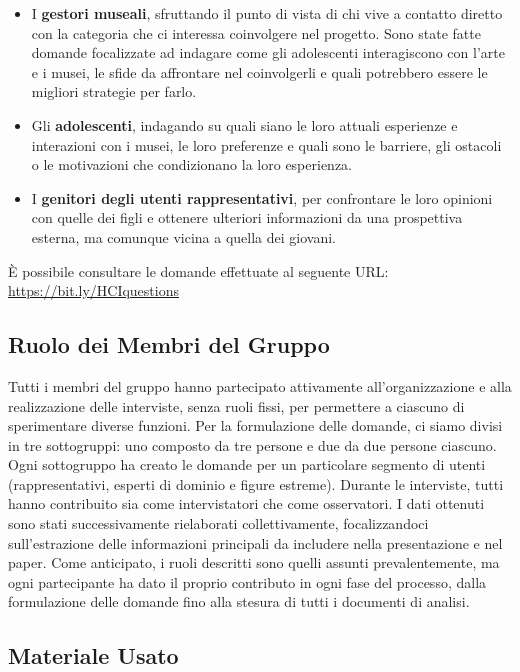 \documentclass{article}
\begin{document}
\begin{itemize}
    \item I \textbf{gestori museali}, sfruttando il punto di vista di chi vive a contatto diretto con la categoria che ci interessa coinvolgere nel progetto. Sono state fatte domande focalizzate ad indagare come gli adolescenti interagiscono con l'arte e i musei, le sfide da affrontare nel coinvolgerli e quali potrebbero essere le migliori strategie per farlo.
    \item Gli \textbf{adolescenti}, indagando su quali siano le loro attuali esperienze e interazioni con i musei, le loro preferenze e quali sono le barriere, gli ostacoli o le motivazioni che condizionano la loro esperienza.
    \item I \textbf{genitori degli utenti rappresentativi}, per confrontare le loro opinioni con quelle dei figli e ottenere ulteriori informazioni da una prospettiva esterna, ma comunque vicina a quella dei giovani.
\end{itemize}

\noindent
È possibile consultare le domande effettuate al seguente URL: \url{https://bit.ly/HCIquestions}

\subsection{Ruolo dei Membri del Gruppo}

Tutti i membri del gruppo hanno partecipato attivamente all’organizzazione e alla realizzazione delle interviste, senza ruoli fissi, per permettere a ciascuno di sperimentare diverse funzioni. Per la formulazione delle domande, ci siamo divisi in tre sottogruppi: uno composto da tre persone e due da due persone ciascuno. Ogni sottogruppo ha creato le domande per un particolare segmento di utenti (rappresentativi, esperti di dominio e figure estreme). Durante le interviste, tutti hanno contribuito sia come intervistatori che come osservatori. I dati ottenuti sono stati successivamente rielaborati collettivamente, focalizzandoci sull’estrazione delle informazioni principali da includere nella presentazione e nel paper. Come anticipato, i ruoli descritti sono quelli assunti prevalentemente, ma ogni partecipante ha dato il proprio contributo in ogni fase del processo, dalla formulazione delle domande fino alla stesura di tutti i documenti di analisi.

\subsection{Materiale Usato}
\end{document}
